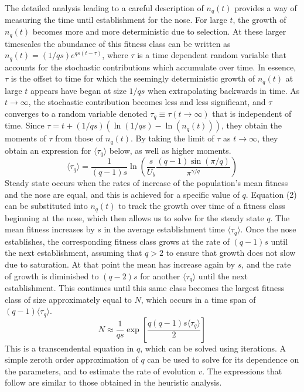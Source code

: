 \documentclass[12pt, one column]{article}
\begin{document}
The detailed analysis leading to a careful description of $n_q(t)$ provides a way of measuring the time until establishment for the nose.  For large $t$, the growth of $n_q(t)$ becomes more and more deterministic due to selection.  At these larger timescales the abundance of this fitness class can be written as $n_q(t) = (1/qs) e^{qs(t-\tau)}$, where $\tau$ is a time dependent random variable that accounts for the stochastic contributions which accumulate over time.  In essence, $\tau$ is the offset to time for which the seemingly deterministic growth of $n_q(t)$ at large $t$ appears have began at size $1/qs$ when extrapolating backwards in time.  As $t\rightarrow \infty$, the stochastic contribution becomes less and less significant, and $\tau$ converges to a random variable denoted $\tau_q \equiv \tau (t\rightarrow \infty)$ that is independent of time.  Since $\tau = t +(1/qs)(\ln(1/qs)-\ln(n_q(t)))$, they obtain the moments of $\tau$ from those of $n_q(t)$.  By taking the limit of $\tau$ as $t\rightarrow \infty$, they obtain an expression for $\langle \tau_q \rangle$ below, as well as higher moments. 
\begin{equation} 
\langle \tau_q \rangle = \frac{1}{(q-1)s}\ln\left(\frac{s}{U_b}\frac{(q-1)\sin(\pi/q)}{\pi^{\gamma/q}}\right)
\end{equation}
Steady state occurs when the rates of increase of the population's mean fitness and the nose are equal, and this is achieved for a specific value of $q$.  Equation (2) can be substituted into $n_q(t)$ to track the growth over time of a fitness class beginning at the nose, which then allows us to solve for the steady state $q$.  The mean fitness increases by $s$ in the average establishment time $\langle \tau_q \rangle$.  Once the nose establishes, the corresponding fitness class grows at the rate of $(q-1)s$ until the next establishment, assuming that $q>2$ to ensure that growth does not slow due to saturation.  At that point the mean has increase again by $s$, and the rate of growth is diminished to $(q-2)s$ for another $\langle \tau_q \rangle$ until the next establishment.  This continues until this same class becomes the largest fitness class of size approximately equal to $N$, which occurs in a time span of $(q-1) \langle \tau_q \rangle$.
\begin{equation}
N \approx  \frac{1}{qs} \exp\left[ \frac{q(q-1)s \langle \tau_q \rangle}{2}\right]  
\end{equation}
This is a transcendental equation in $q$, which can be solved using iterations.  A simple zeroth order approximation of $q$ can be used to solve for its dependence on the parameters, and to estimate the rate of evolution $v$. The expressions that follow are similar to those obtained in the heuristic analysis.
\end{document}
